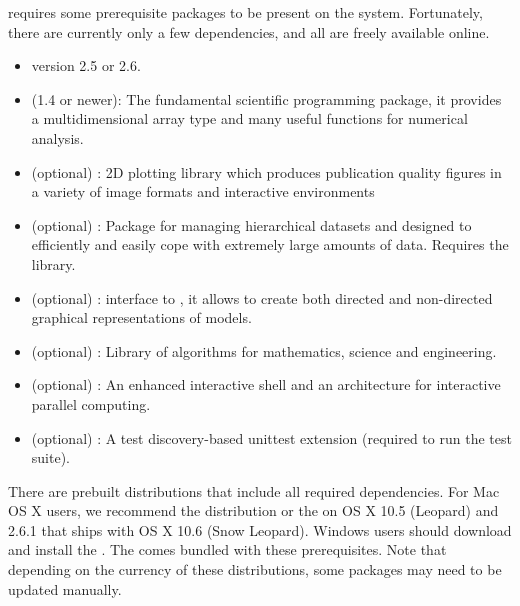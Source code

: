 \documentclass[]{jss}
\begin{document}
 requires some prerequisite packages to be present on the system.
Fortunately, there are currently only a few dependencies, and all are
freely available online.
%
\begin{itemize}

\item {} version 2.5 or 2.6.

\item {} (1.4 or newer): The fundamental scientific programming package, it provides a
multidimensional array type and many useful functions for numerical analysis.

\item {} \citep{matplotlib} (optional) : 2D plotting library which produces publication
quality figures in a variety of image formats and interactive environments

\item {} \citep{tables} (optional) : Package for managing hierarchical datasets and
designed to efficiently and easily cope with extremely large amounts of data.
Requires the  library.

\item {} \citep{pydot} (optional) :  interface to  \citep{graphviz}, it allows
 to create both directed and non-directed graphical representations of models.

\item {} \citep{scipy} (optional) : Library of algorithms for mathematics, science
and engineering.

\item {} \citep{ipython}  (optional) : An enhanced interactive  shell and an
architecture for interactive parallel computing.

\item {} \citep{nose} (optional) : A test discovery-based unittest extension (required to run the test suite).

\end{itemize}

There are prebuilt distributions that include all required dependencies. For
Mac OS X users, we recommend the  \citep{macpython} distribution or the
 \citep{epd} on OS X 10.5 (Leopard) and  2.6.1 that
ships with OS X 10.6 (Snow Leopard). Windows users should download and install the
. The  comes
bundled with these prerequisites. Note that depending on the currency of these
distributions, some packages may need to be updated manually.
\end{document}
